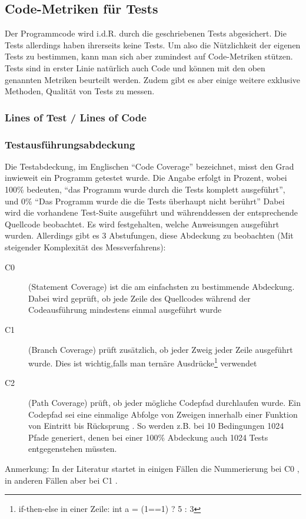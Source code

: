 

\subsection{Code-Metriken für Tests}
Der Programmcode wird i.d.R. durch die geschriebenen Tests abgesichert. Die Tests allerdings haben ihrerseits keine Tests. Um also die Nützlichkeit der eigenen Tests zu bestimmen, kann man sich aber zumindest auf Code-Metriken stützen.
Tests sind in erster Linie natürlich auch Code und können mit den oben genannten Metriken beurteilt werden. Zudem gibt es aber einige weitere exklusive Methoden, Qualität von Tests zu messen. 

\subsubsection{Lines of Test / Lines of Code}
        
\subsubsection{Testausführungsabdeckung}
Die Testabdeckung, im Englischen "`Code Coverage"' bezeichnet, misst den Grad inwieweit ein Programm getestet wurde. Die Angabe erfolgt in Prozent, wobei 100\% bedeuten, "`das Programm wurde durch die Tests komplett ausgeführt"', und 0\% "`Das Programm wurde die die Tests überhaupt nicht berührt"' Dabei wird die vorhandene Test-Suite ausgeführt und währenddessen der entsprechende Quellcode beobachtet. Es wird festgehalten, welche Anweisungen ausgeführt wurden. Allerdings gibt es 3 Abstufungen, diese Abdeckung zu beobachten (Mit steigender Komplexität des Messverfahrens):
\begin{description}
 \item[C0] (Statement Coverage) ist die am einfachsten zu bestimmende Abdeckung. Dabei wird geprüft, ob jede Zeile des Quellcodes während der Codeausführung mindestens einmal ausgeführt wurde
 \item[C1] (Branch Coverage) prüft zusätzlich, ob jeder Zweig jeder Zeile ausgeführt wurde. Dies ist wichtig,falls man ternäre Ausdrücke\footnote{if-then-else in einer Zeile: int a = (1==1) ? 5 : 3} verwendet
 \item[C2] (Path Coverage) prüft, ob jeder mögliche Codepfad durchlaufen wurde. Ein Codepfad sei eine einmalige Abfolge von Zweigen innerhalb einer Funktion von Eintritt bis Rücksprung \citep{steve_cornett_code_1996}. So werden z.B. bei 10 Bedingungen 1024 Pfade generiert, denen bei einer 100\% Abdeckung auch 1024 Tests entgegenstehen müssten.
 \end{description}
 Anmerkung: In der Literatur startet in einigen Fällen die Nummerierung bei C0 \citep{catherine_powell_abakas_2008}, in anderen Fällen aber bei C1 \citep{steve_cornett_code_1996}.
 
